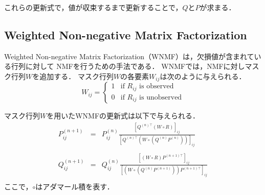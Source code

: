 これらの更新式で，値が収束するまで更新することで，$Q$と$P$が求まる．

\subsection{Weighted Non-negative Matrix Factorization}
Weighted Non-negative Matrix Factorization（WNMF）は，欠損値が含まれている行列に対して
NMFを行うための手法である\cite{wnmf}．
WNMFでは，NMFに対しマスク行列$W$を追加する．
マスク行列$W$の各要素$W_{ij}$は次のように与えられる．
\begin{equation}
  W_{ij} =
  \begin{cases}
    1 & \text{if $R_{ij}$ is observed} \\
    0 & \text{if $R_{ij}$ is unobserved}
  \end{cases}
\end{equation}

マスク行列$W$を用いたWNMFの更新式は以下で与えられる．
\begin{eqnarray}
  P_{ij}^{(n+1)} &=& P_{ij}^{(n)} \frac{\left[ Q^{(n)\top} (W \circ R) \right]_{ij}}{\left[ Q^{(n)\top} (W \circ (Q^{(n)} P^{(n)})) \right]_{ij}} \nonumber \\
  && \\
  Q_{ij}^{(n+1)} &=& Q_{ij}^{(n)} \frac{\left[ (W \circ R) P^{(n+1)\top} \right]_{ij}}{\left[ (W \circ (Q^{(n)} P^{(n+1)})) P^{(n+1)\top} \right]_{ij}} \nonumber \\
  &&
\end{eqnarray}
ここで，$\circ$はアダマール積を表す．
